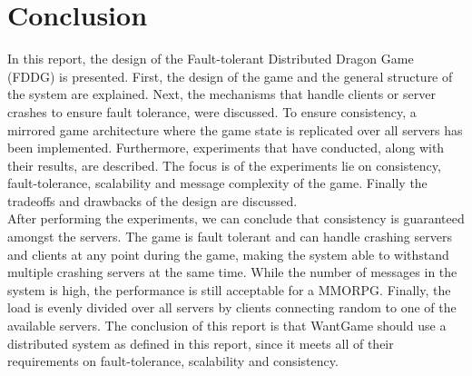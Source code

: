 \section{Conclusion}
In this report, the design of the Fault-tolerant Distributed Dragon Game (FDDG) is presented. First, the design of the game and the general structure of the system are explained. Next, the mechanisms that handle clients or server crashes to ensure fault tolerance, were discussed. To ensure consistency, a mirrored game architecture where the game state is replicated over all servers has been implemented. Furthermore, experiments that have conducted, along with their results, are described. The focus is of the experiments lie on consistency, fault-tolerance, scalability and message complexity of the game. Finally the tradeoffs and drawbacks of the design are discussed.\\
After performing the experiments, we can conclude that consistency is guaranteed amongst the servers. The game is fault tolerant and can handle crashing servers and clients at any point during the game, making the system able to withstand multiple crashing servers at the same time. While the number of messages in the system is high, the performance is still acceptable for a MMORPG. Finally, the load is evenly divided over all servers by clients connecting random to one of the available servers.
The conclusion of this report is that WantGame should use a distributed system as defined in this report, since it meets all of their requirements on fault-tolerance, scalability and consistency.